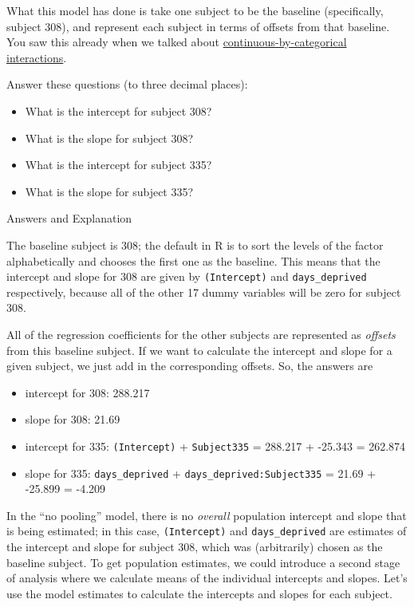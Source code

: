 \documentclass[]{book}
\providecommand{\tightlist}{%
  \setlength{\itemsep}{0pt}\setlength{\parskip}{0pt}}
\begin{document}
What this model has done is take one subject to be the baseline (specifically, subject 308), and represent each subject in terms of offsets from that baseline. You saw this already when we talked about \href{05-interactions-course-notes.html\#cont-by-cat}{continuous-by-categorical interactions}.

Answer these questions (to three decimal places):

\begin{itemize}
\tightlist
\item
  What is the intercept for subject 308? 
\item
  What is the slope for subject 308? 
\item
  What is the intercept for subject 335? 
\item
  What is the slope for subject 335? 
\end{itemize}

Answers and Explanation

The baseline subject is 308; the default in R is to sort the levels of the factor alphabetically and chooses the first one as the baseline. This means that the intercept and slope for 308 are given by \texttt{(Intercept)} and \texttt{days\_deprived} respectively, because all of the other 17 dummy variables will be zero for subject 308.

All of the regression coefficients for the other subjects are represented as \emph{offsets} from this baseline subject. If we want to calculate the intercept and slope for a given subject, we just add in the corresponding offsets. So, the answers are

\begin{itemize}
\item
  intercept for 308: 288.217
\item
  slope for 308: 21.69
\item
  intercept for 335: \texttt{(Intercept)} + \texttt{Subject335} = 288.217 + -25.343 = 262.874
\item
  slope for 335: \texttt{days\_deprived} + \texttt{days\_deprived:Subject335} = 21.69 + -25.899 = -4.209
\end{itemize}

In the ``no pooling'' model, there is no \emph{overall} population intercept and slope that is being estimated; in this case, \texttt{(Intercept)} and \texttt{days\_deprived} are estimates of the intercept and slope for subject 308, which was (arbitrarily) chosen as the baseline subject. To get population estimates, we could introduce a second stage of analysis where we calculate means of the individual intercepts and slopes. Let's use the model estimates to calculate the intercepts and slopes for each subject.
\end{document}
